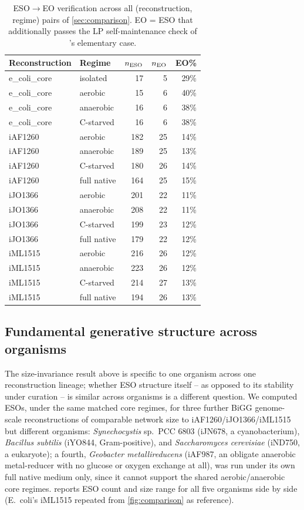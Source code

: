 \documentclass[nocrop]{bioinfo}
\begin{document}
\begin{table}[t]
\centering
\caption{ESO$\to$EO verification across all (reconstruction, regime) pairs of
\cref{sec:comparison}. EO = ESO that additionally passes the LP self-maintenance check of
\citet{centler2008computing}'s elementary case.}
\label{tab:eso-eo}
\small
\begin{tabular}{llrrr}
\hline
Reconstruction & Regime & $n_{\rm ESO}$ & $n_{\rm EO}$ & EO\% \\
\hline
e\_coli\_core & isolated   & 17  & 5  & 29\% \\
e\_coli\_core & aerobic    & 15  & 6  & 40\% \\
e\_coli\_core & anaerobic  & 16  & 6  & 38\% \\
e\_coli\_core & C-starved  & 16  & 6  & 38\% \\
iAF1260 & aerobic    & 182 & 25 & 14\% \\
iAF1260 & anaerobic  & 189 & 25 & 13\% \\
iAF1260 & C-starved  & 180 & 26 & 14\% \\
iAF1260 & full native & 164 & 25 & 15\% \\
iJO1366 & aerobic    & 201 & 22 & 11\% \\
iJO1366 & anaerobic  & 208 & 22 & 11\% \\
iJO1366 & C-starved  & 199 & 23 & 12\% \\
iJO1366 & full native & 179 & 22 & 12\% \\
iML1515 & aerobic    & 216 & 26 & 12\% \\
iML1515 & anaerobic  & 223 & 26 & 12\% \\
iML1515 & C-starved  & 214 & 27 & 13\% \\
iML1515 & full native & 194 & 26 & 13\% \\
\hline
\end{tabular}
\end{table}

\subsection{Fundamental generative structure across organisms}
\label{sec:organisms}
The size-invariance result above is specific to one organism across one reconstruction
lineage; whether ESO structure itself -- as opposed to its stability under curation -- is
similar across organisms is a different question. We computed ESOs, under the same matched
core regimes, for three further BiGG genome-scale reconstructions of comparable network size to
iAF1260/iJO1366/iML1515 but different organisms: \textit{Synechocystis} sp.\ PCC 6803 (iJN678, a
cyanobacterium), \textit{Bacillus subtilis} (iYO844, Gram-positive), and \textit{Saccharomyces
cerevisiae} (iND750, a eukaryote); a fourth, \textit{Geobacter metallireducens} (iAF987, an
obligate anaerobic metal-reducer with no glucose or oxygen exchange at all), was run under its
own full native medium only, since it cannot support the shared aerobic/anaerobic core regimes.
 reports ESO count and size range for all five organisms side by side
(E.\ coli's iML1515 repeated from \cref{fig:comparison} as reference).
\end{document}
